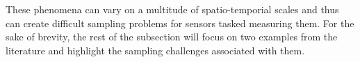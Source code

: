 %
%
%
%

These phenomena can vary on a multitude of spatio-temporial scales and thus can create difficult sampling problems for sensors tasked measuring them. For the sake of brevity, the rest of the subsection will focus on two examples from the literature and highlight the sampling challenges associated with them.

